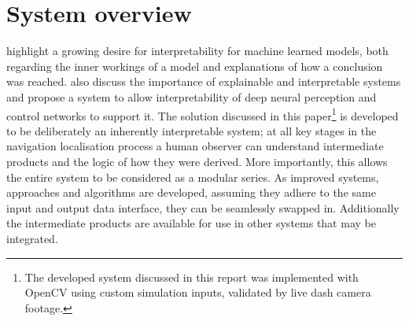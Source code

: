 \documentclass[]{aiaa-tc}%
\begin{document}
%

\section{System overview}
\citet{explainableAIStakeholders} highlight a growing desire for interpretability for machine learned models, both regarding the inner workings of a model and explanations of how a conclusion was reached. \citep{explainableCNNBookChapter} also discuss the importance of explainable and interpretable systems and propose a system to allow interpretability of deep neural perception and control networks to support it. The solution discussed in this paper\footnote{The developed system discussed in this report was implemented with OpenCV using custom simulation inputs, validated by live dash camera footage.} is developed to be deliberately an inherently interpretable system; at all key stages in the navigation localisation process a human observer can understand intermediate products and the logic of how they were derived.  More importantly, this allows the entire system to be considered as a modular series. As improved systems, approaches and algorithms are developed, assuming they adhere to the same input and output data interface, they can be seamlessly swapped in. Additionally the intermediate products are available for use in other systems that may be integrated.
\end{document}

